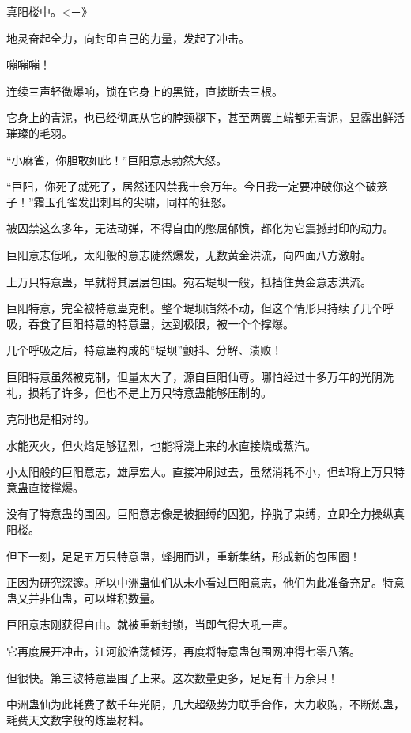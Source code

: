 
\begin{this_body}

真阳楼中。<－》

地灵奋起全力，向封印自己的力量，发起了冲击。

嘣嘣嘣！

连续三声轻微爆响，锁在它身上的黑链，直接断去三根。

它身上的青泥，也已经彻底从它的脖颈褪下，甚至两翼上端都无青泥，显露出鲜活璀璨的毛羽。

“小麻雀，你胆敢如此！”巨阳意志勃然大怒。

“巨阳，你死了就死了，居然还囚禁我十余万年。今日我一定要冲破你这个破笼子！”霜玉孔雀发出刺耳的尖啸，同样的狂怒。

被囚禁这么多年，无法动弹，不得自由的憋屈郁愤，都化为它震撼封印的动力。

巨阳意志低吼，太阳般的意志陡然爆发，无数黄金洪流，向四面八方激射。

上万只特意蛊，早就将其层层包围。宛若堤坝一般，抵挡住黄金意志洪流。

巨阳特意，完全被特意蛊克制。整个堤坝岿然不动，但这个情形只持续了几个呼吸，吞食了巨阳特意的特意蛊，达到极限，被一个个撑爆。

几个呼吸之后，特意蛊构成的“堤坝”颤抖、分解、溃败！

巨阳特意虽然被克制，但量太大了，源自巨阳仙尊。哪怕经过十多万年的光阴洗礼，损耗了许多，但也不是上万只特意蛊能够压制的。

克制也是相对的。

水能灭火，但火焰足够猛烈，也能将浇上来的水直接烧成蒸汽。

小太阳般的巨阳意志，雄厚宏大。直接冲刷过去，虽然消耗不小，但却将上万只特意蛊直接撑爆。

没有了特意蛊的围困。巨阳意志像是被捆缚的囚犯，挣脱了束缚，立即全力操纵真阳楼。

但下一刻，足足五万只特意蛊，蜂拥而进，重新集结，形成新的包围圈！

正因为研究深邃。所以中洲蛊仙们从未小看过巨阳意志，他们为此准备充足。特意蛊又并非仙蛊，可以堆积数量。

巨阳意志刚获得自由。就被重新封锁，当即气得大吼一声。

它再度展开冲击，江河般浩荡倾泻，再度将特意蛊包围网冲得七零八落。

但很快。第三波特意蛊围了上来。这次数量更多，足足有十万余只！

中洲蛊仙为此耗费了数千年光阴，几大超级势力联手合作，大力收购，不断炼蛊，耗费天文数字般的炼蛊材料。


\end{this_body}
